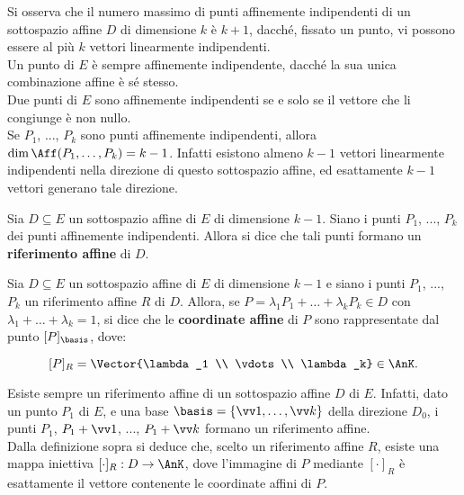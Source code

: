 \documentclass[11pt]{article}
\begin{document}
	\begin{remark}\nl
		\li Si osserva che il numero massimo di punti affinemente indipendenti di un sottospazio affine $D$
		di dimensione $k$ è $k+1$, dacché, fissato un punto, vi possono essere al più $k$ vettori linearmente indipendenti. \\
		\li Un punto di $E$ è sempre affinemente indipendente, dacché la sua unica combinazione affine è
		sé stesso. \\
		\li Due punti di $E$ sono affinemente indipendenti se e solo
		se il vettore che li congiunge è non nullo. \\
		\li Se $P_1$, ..., $P_k$ sono punti affinemente indipendenti,
		allora $\dim \Aff(P_1, \ldots, P_k) = k-1$. Infatti esistono
		almeno $k-1$ vettori linearmente indipendenti nella direzione
		di questo sottospazio affine, ed esattamente $k-1$ vettori
		generano tale direzione.
	\end{remark}
	
	\begin{definition}  Sia $D \subseteq E$ un sottospazio affine di $E$ di dimensione $k-1$.
		Siano i punti $P_1$, ..., $P_k$ dei punti affinemente indipendenti. Allora
		si dice che tali punti formano un \textbf{riferimento affine} di $D$.
	\end{definition}
	
	\begin{definition}  Sia $D \subseteq E$ un sottospazio affine di $E$ di dimensione $k-1$
		e siano i punti $P_1$, ..., $P_k$ un riferimento affine $R$ di $D$. Allora, se $P = \lambda_1 P_1 + \ldots + \lambda_k P_k \in D$ con $\lambda_1 + \ldots + \lambda_k = 1$, si dice che le \textbf{coordinate affine}
		di $P$ sono rappresentate dal punto $[P]_\basis$, dove:
		
		\[ [P]_R = \Vector{\lambda_1 \\ \vdots \\ \lambda_k} \in \AnK. \]
	\end{definition}
	
	\begin{remark}\nl
		\li Esiste sempre un riferimento affine di un sottospazio affine $D$ di $E$. Infatti, dato un punto $P_1$
		di $E$, e una base $\basis = \{\vv 1, \ldots, \vv k\}$ della direzione $D_0$, i punti $P_1$, $P_1 + \vv 1$, ...,
		$P_1 + \vv k$ formano un riferimento affine. \\
		\li Dalla definizione sopra si deduce che, scelto un riferimento affine $R$, esiste una mappa iniettiva $[\cdot]_R : D \to \AnK$, dove l'immagine di $P$ mediante $[\cdot]_R$ è esattamente il vettore
		contenente le coordinate affini di $P$.  
	\end{remark}
	
\end{document}
